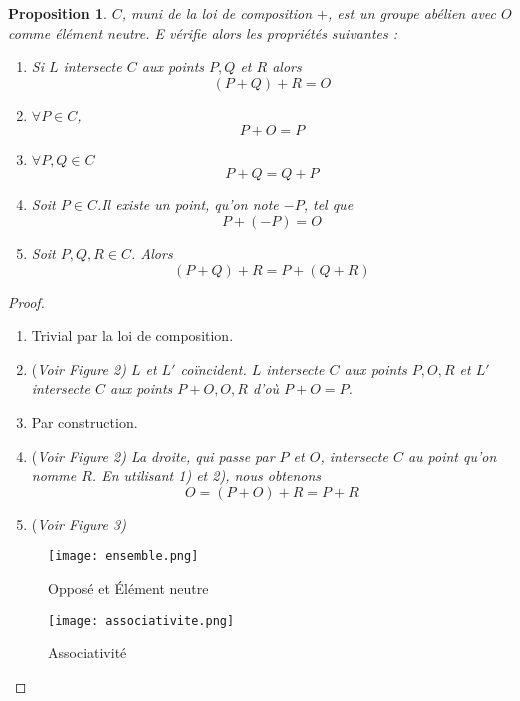\documentclass[a4paper]{article}
\newtheorem{prop}{Proposition}
\begin{document}
\begin{prop}
$C$, muni de la loi de composition $+$, est un groupe abélien avec $O$ comme élément neutre.
E vérifie alors les propriétés suivantes :
\begin{enumerate}
\item Si $L$ intersecte $C$ aux points $P,Q$ et $R$ alors
\begin{equation*}
(P+Q)+R=O
\end{equation*}
\item $\forall P \in C$, 
\begin{equation*}
P+O=P
\end{equation*}
\item $\forall P,Q \in C$
\begin{equation*}
P+Q=Q+P
\end{equation*}
\item Soit $P \in C$.Il existe un point, qu'on note $-P$, tel que
\begin{equation*}
P+(-P)=O
\end{equation*}
\item Soit $P,Q,R \in C$. Alors
\begin{equation*}
(P+Q)+R=P+(Q+R)
\end{equation*}
\end{enumerate}
\end{prop}
\begin{proof} 
\begin{enumerate}
\item Trivial par la loi de composition. 
\item (\it{Voir Figure 2}) $L$ et $L'$ coïncident. $L$ intersecte $C$ aux points $P,O,R$ et $L'$ intersecte $C$ aux points $P+O,O,R$ d'où $P+O=P$. 
\item Par construction.
\item (\it{Voir Figure 2}) La droite, qui passe par $P$ et $O$, intersecte $C$ au point qu'on nomme $R$. En utilisant 1) et 2), nous obtenons 
\begin{equation*}
O=(P+O)+R=P+R
\end{equation*}
\item (\it{Voir Figure 3})
\end{enumerate}

\begin{figure}[h]
\centering
\texttt{[image: ensemble.png]}
\caption{Opposé et Élément neutre}
\label{neutre}
\end{figure}
\begin{figure}[h]
\centering
\texttt{[image: associativite.png]}
\caption{Associativité}
\label{neutre}
\end{figure}

\end{proof}
\end{document}
